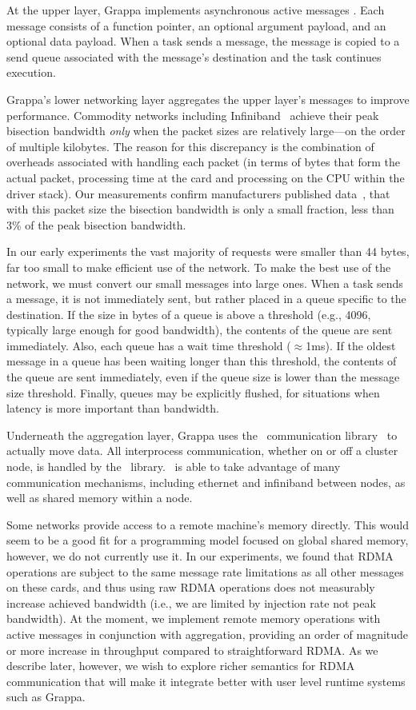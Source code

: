 At the upper layer, Grappa implements asynchronous active messages \cite{vonEicken92}. Each message consists of a function pointer, an optional argument payload, and an optional data payload. When a task sends a message, the message is copied to a send queue associated with the message's destination and the task continues execution.

Grappa's lower networking layer aggregates the upper layer's messages to
improve performance. Commodity networks including
Infiniband~\cite{infinibandbandwidth} achieve their peak bisection bandwidth
\emph{only} when the packet sizes are relatively large---on the order of
multiple kilobytes. The reason for this discrepancy is the combination of
overheads associated with handling each packet (in terms of bytes that form
the actual packet, processing time at the card and processing on the CPU
within the driver stack). Our measurements confirm manufacturers published
data~\cite{infinibandbandwidth}, that with this packet size the bisection
bandwidth is only a small fraction, less than 3\% of the peak bisection
bandwidth.

In our early experiments the vast majority of requests were smaller than 44
bytes, far too small to make efficient use of the network. To make the best
use of the network, we must convert our small messages into large ones. When a
task sends a message, it is not immediately sent, but rather placed in a queue
specific to the destination. If the size in bytes of a queue is above a
threshold (e.g., 4096, typically large enough for good bandwidth), the
contents of the queue are sent immediately. Also, each queue has a wait time
threshold ($\approx${1ms}). If the oldest message in a queue has been waiting
longer than this threshold, the contents of the queue are sent immediately,
even if the queue size is lower than the message size threshold. Finally,
queues may be explicitly flushed, for situations when latency is more
important than bandwidth.

Underneath the aggregation layer, Grappa uses the \gasnet~communication
library~\cite{gasnet} to actually move data. All interprocess communication,
whether on or off a cluster node, is handled by the \gasnet~library.
\gasnet~is able to take advantage of many communication mechanisms, including
ethernet and infiniband between nodes, as well as shared memory within a node.

Some networks provide access to a remote machine's memory directly. This would seem to be a good fit for a programming model focused on global shared memory, however, we do not currently use it. In our experiments, we found that RDMA operations are subject to the same message rate limitations as all other messages on these cards, and thus using raw RDMA operations does not measurably increase achieved bandwidth (i.e., we are limited by injection rate not peak bandwidth).  At the moment, we implement remote memory operations with active messages in conjunction with aggregation, providing an order of magnitude or more increase in throughput compared to straightforward RDMA. As we describe later, however, we wish to explore richer semantics for RDMA communication that will make it integrate better with user level runtime systems such as Grappa.

